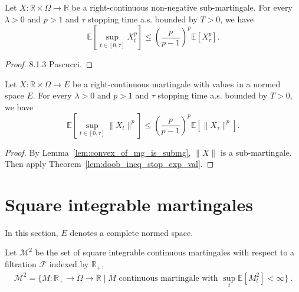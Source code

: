 \begin{lemma}\label{lem:doob_ineq_stop_exp_val}
  Let $X:\mathbb{R}\times\Omega\rightarrow \mathbb{R}$ be a right-continuous non-negative sub-martingale.
  For every $\lambda>0$ and $p>1$ and $\tau$ stopping time a.s. bounded by $T>0$, we have
  $$
  \mathbb{E}\left[ \sup_{t\in[0,\tau]}X_t^p \right]\leq \left(\frac{p}{p-1}\right)^p\mathbb{E}[X_\tau^p].
  $$
\end{lemma}
\begin{proof}
  8.1.3 Pascucci.
\end{proof}

\begin{corollary}\label{cor:doob_ineq_stop_exp_val}
  Let $X:\mathbb{R}\times\Omega\rightarrow E$ be a right-continuous martingale with values in a normed space $E$.
  For every $\lambda>0$ and $p>1$ and $\tau$ stopping time a.s. bounded by $T>0$, we have
  $$
  \mathbb{E}\left[ \sup_{t\in[0,\tau]}\lVert X_t \rVert^p \right]\leq \left(\frac{p}{p-1}\right)^p\mathbb{E}[\lVert X_\tau \rVert^p].
  $$
\end{corollary}
\begin{proof}
  By Lemma~\ref{lem:convex_of_mg_is_submg}, $\lVert X \rVert$ is a sub-martingale.
  Then apply Theorem~\ref{lem:doob_ineq_stop_exp_val}.
\end{proof}

\section{Square integrable martingales}

In this section, $E$ denotes a complete normed space.

\begin{definition}\label{def:squareIntegrableMartingales}
Let $\mathcal{M}^2$ be the set of square integrable continuous martingales with respect to a filtration $\mathcal{F}$ indexed by $\mathbb{R}_+$,
\begin{align*}
  \mathcal{M}^2
  = \{ M : \mathbb{R}_+ \to \Omega \to \mathbb{R} \mid M \text{ continuous martingale with } \sup_{t}\mathbb{E}[M_t^2] < \infty \}
  \: .
\end{align*}
\end{definition}


